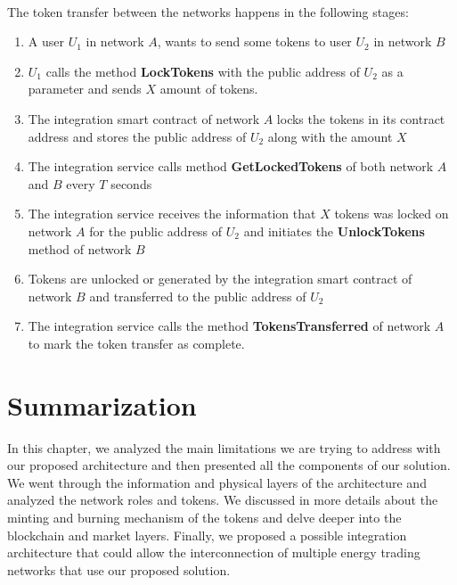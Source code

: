 \\ 
The token transfer between the networks happens in the following stages:
\begin{enumerate}
    \item A user $U_1$ in network $A$, wants to send some tokens to user $U_2$ in network $B$
    \item $U_1$ calls the method \textbf{LockTokens} with the public address of $U_2$ as a parameter and sends $X$ amount of tokens.
    \item The integration smart contract of network $A$ locks the tokens in its contract address and stores the public address of $U_2$ along with the amount $X$
    \item The integration service calls method \textbf{GetLockedTokens} of both network $A$ and $B$ every $T$ seconds
    \item The integration service receives the information that $X$ tokens was locked on network $A$ for the public address of $U_2$ and initiates the \textbf{UnlockTokens} method of network $B$
    \item Tokens are unlocked or generated by the integration smart contract of network $B$ and transferred to the public address of $U_2$
    \item The integration service calls the method \textbf{TokensTransferred} of network $A$ to mark the token transfer as complete.
\end{enumerate}
\pagebreak
\section{Summarization}
In this chapter, we analyzed the main limitations we are trying to address with our proposed architecture and then presented all the components of our solution. We went through the information and physical
layers of the architecture and analyzed the network roles and tokens. We discussed in more details about the minting and burning mechanism of the tokens and delve deeper into the blockchain and market layers.
Finally, we proposed a possible integration architecture that could allow the interconnection of multiple energy trading networks that use our proposed solution.